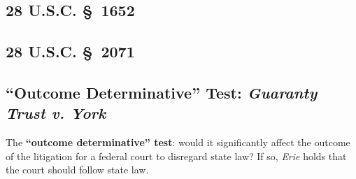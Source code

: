 \subsection{28 U.S.C. \S\ 1652} %

\subsection{28 U.S.C. \S\ 2071} %

\subsection{``Outcome Determinative'' Test: \emph{Guaranty Trust v. York}}

The \textbf{``outcome determinative'' test}: would it significantly 
affect the outcome of the litigation for a federal court to disregard state 
law? If so, \emph{Erie} holds that the court should follow state law.

